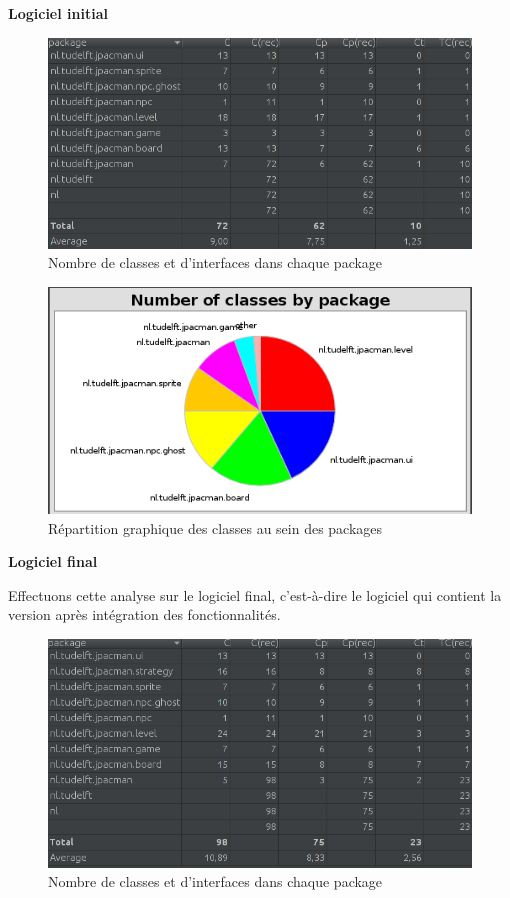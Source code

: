 \documentclass[12pt, openany]{report}
\begin{document}
\textbf{Logiciel initial}

\begin{figure}[!h]
	\centering
	\includegraphics[scale=0.6]{Images/classMetrics1.png} 
	\caption{Nombre de classes et d'interfaces dans chaque package}
	\label{classMetrics1}
\end{figure}

\begin{figure}[!h]
	\centering
	\includegraphics[scale=0.7]{Images/classMetrics2.png} 
	\caption{Répartition graphique des classes au sein des packages}
	\label{classMetrics2}
\end{figure}

\textbf{Logiciel final}

Effectuons cette analyse sur le logiciel final, c'est-à-dire le logiciel qui contient la version après intégration des fonctionnalités.

\begin{figure}[!h]
	\centering
	\includegraphics[scale=0.6]{Images/classMetrics3.png} 
	\caption{Nombre de classes et d'interfaces dans chaque package}
	\label{classMetrics3}
\end{figure}
\end{document}
